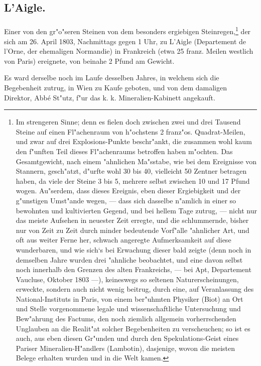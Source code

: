 \documentclass[a4paper, 11pt, oneside, german]{article}
\begin{document}
\subsection{L'Aigle.}
\paragraph{}
Einer von den gr"o"seren Steinen von dem besonders ergiebigen Steinregen,\footnote{Im strengeren Sinne; denn es fielen doch zwischen zwei und drei Tausend Steine auf einen Fl"achenraum von h"ochstens 2 franz"os. Quadrat-Meilen, und zwar auf drei Explosions-Punkte beschr"ankt, die zusammen wohl kaum den f"unften Teil dieses Fl"achenraums betroffen haben m"ochten. Das Gesamtgewicht, nach einem "ahnlichen Ma"sstabe, wie bei dem Ereignisse von Stannern, gesch"atzt, d"urfte wohl 30 bis 40, vielleicht 50 Zentner betragen haben, da viele der Steine 3 bis 5, mehrere selbst zwischen 10 und 17 Pfund wogen. Au"serdem, dass dieses Ereignis, eben dieser Ergiebigkeit und der g"unstigen Umst"ande wegen, --- dass sich dasselbe n"amlich in einer so bewohnten und kultivierten Gegend, und bei hellem Tage zutrug, --- nicht nur das meiste Aufsehen in neuester Zeit erregte, und die schlummernde, bisher nur von Zeit zu Zeit durch minder bedeutende Vorf"alle "ahnlicher Art, und oft aus weiter Ferne her, schwach angeregte Aufmerksamkeit auf diese wunderbaren, und wie sich‘s bei Erwachung dieser bald zeigte (denn noch in demselben Jahre wurden drei "ahnliche beobachtet, und eine davon selbst noch innerhalb den Grenzen des alten Frankreichs, --- bei Apt, Departement Vaucluse, Oktober 1803 ---), keineswegs so seltenen Naturerscheinungen, erweckte, sondern auch nicht wenig beitrug, durch eine, auf Veranlassung des National-Instituts in Paris, von einem ber"uhmten Physiker (Biot) an Ort und Stelle vorgenommene legale und wissenschaftliche Untersuchung und Bew"ahrung des Factums, den noch ziemlich allgemein vorherrschenden Unglauben an die Realit"at solcher Begebenheiten zu verscheuchen; so ist es auch, aus eben diesen Gr"unden und durch den Spekulations-Geist eines Pariser Mineralien-H"andlers (Lambotin), dasjenige, wovon die meisten Belege erhalten wurden und in die Welt kamen.} der sich am 26. April 1803, Nachmittags gegen 1 Uhr, zu L'Aigle (Departement de l'Orne, der ehemaligen Normandie) in Frankreich (etwa 25 franz. Meilen westlich von Paris) ereignete, von beinahe 2 Pfund am Gewicht.

Es ward derselbe noch im Laufe desselben Jahres, in welchem sich die Begebenheit zutrug, in Wien zu Kaufe geboten, und von dem damaligen Direktor, Abbé St"utz, f"ur das k. k. Mineralien-Kabinett angekauft.
\end{document}
